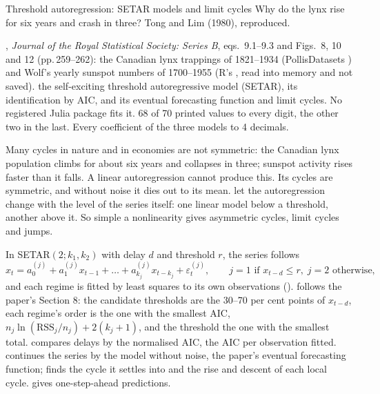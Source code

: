 



  {Threshold autoregression: SETAR models and limit cycles}
  {Why do the lynx rise for six years and crash in three? Tong and Lim (1980), reproduced.}

\factsheet
  {, \emph{Journal of the Royal Statistical Society: Series B}, eqs.\ 9.1--9.3 and
   Figs.\ 8, 10 and 12 (pp.\,259--262): the Canadian lynx trappings of 1821--1934 (PollisDatasets ) and
   Wolf's yearly sunspot numbers of 1700--1955 (R's , read into memory and not saved).}
  {the self-exciting threshold autoregressive model (SETAR), its identification by AIC, and its eventual forecasting
   function and limit cycles. No registered Julia package fits it.}
  {}
  {68 of 70 printed values to every digit, the other two in the last. Every coefficient of the three models to 4 decimals.}

Many cycles in nature and in economies are not symmetric: the Canadian lynx population climbs for about six years and
collapses in three; sunspot activity rises faster than it falls. A linear autoregression cannot produce this. Its cycles
are symmetric, and without noise it dies out to its mean.  let the autoregression
change with the level of the series itself: one linear model below a threshold, another above it. So simple a
nonlinearity gives asymmetric cycles, limit cycles and jumps.

In SETAR$(2; k_1, k_2)$ with delay $d$ and threshold $r$, the series follows
\[ x_t = a_0^{(j)} + a_1^{(j)} x_{t-1} + \dots + a_{k_j}^{(j)} x_{t-k_j} + \varepsilon_t^{(j)}, \qquad
   j = 1 \text{ if } x_{t-d} \le r, \; j = 2 \text{ otherwise}, \]
and each regime is fitted by least squares to its own observations ().  follows the paper's
Section 8: the candidate thresholds are the 30--70 per cent points of $x_{t-d}$, each regime's order is the one with the
smallest AIC, $n_j \ln(\mathrm{RSS}_j/n_j) + 2(k_j + 1)$, and the threshold the one with the smallest total.
 compares delays by the normalised AIC, the AIC per observation fitted.  continues the
series by the model without noise, the paper's eventual forecasting function;  finds the cycle it settles
into and  the rise and descent of each local cycle.  gives one-step-ahead predictions.

